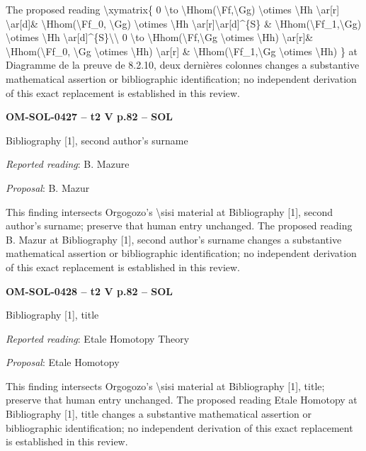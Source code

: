 The proposed reading \textbackslash{}xymatrix\{ 0 \textbackslash{}to \textbackslash{}Hhom(\textbackslash{}Ff,\textbackslash{}Gg) \textbackslash{}otimes \textbackslash{}Hh \textbackslash{}ar[r] \textbackslash{}ar[d]\& \textbackslash{}Hhom(\textbackslash{}Ff\_0, \textbackslash{}Gg) \textbackslash{}otimes \textbackslash{}Hh \textbackslash{}ar[r]\textbackslash{}ar[d]\textasciicircum{}\{S\} \& \textbackslash{}Hhom(\textbackslash{}Ff\_1,\textbackslash{}Gg) \textbackslash{}otimes \textbackslash{}Hh \textbackslash{}ar[d]\textasciicircum{}\{S\}\textbackslash{}\textbackslash{} 0 \textbackslash{}to \textbackslash{}Hhom(\textbackslash{}Ff,\textbackslash{}Gg \textbackslash{}otimes \textbackslash{}Hh) \textbackslash{}ar[r]\& \textbackslash{}Hhom(\textbackslash{}Ff\_0, \textbackslash{}Gg \textbackslash{}otimes \textbackslash{}Hh) \textbackslash{}ar[r] \& \textbackslash{}Hhom(\textbackslash{}Ff\_1,\textbackslash{}Gg \textbackslash{}otimes \textbackslash{}Hh) \} at Diagramme de la preuve de 8.2.10, deux dernières colonnes changes a substantive mathematical assertion or bibliographic identification; no independent derivation of this exact replacement is established in this review.\par
\par\noindent\textbf{OM-SOL-0427 -- t2 V p.82 -- SOL}\par
Bibliography [1], second author's surname\par
\emph{Reported reading}: B. Mazure\par
\emph{Proposal}: B. Mazur\par
This finding intersects Orgogozo's \textbackslash{}sisi material at Bibliography [1], second author's surname; preserve that human entry unchanged. The proposed reading B. Mazur at Bibliography [1], second author's surname changes a substantive mathematical assertion or bibliographic identification; no independent derivation of this exact replacement is established in this review.\par
\par\noindent\textbf{OM-SOL-0428 -- t2 V p.82 -- SOL}\par
Bibliography [1], title\par
\emph{Reported reading}: Etale Homotopy Theory\par
\emph{Proposal}: Etale Homotopy\par
This finding intersects Orgogozo's \textbackslash{}sisi material at Bibliography [1], title; preserve that human entry unchanged. The proposed reading Etale Homotopy at Bibliography [1], title changes a substantive mathematical assertion or bibliographic identification; no independent derivation of this exact replacement is established in this review.\par
